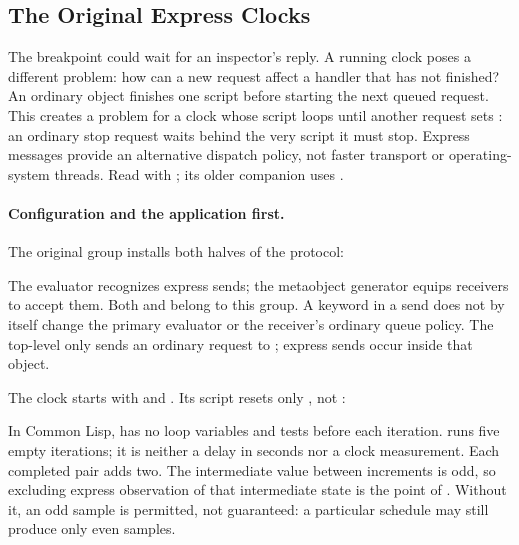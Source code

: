 \subsection{The Original Express Clocks}
\label{sec:original-express}

The breakpoint could wait for an inspector's reply. A running clock poses
a different problem: how can a new request affect a handler that has
not finished? An ordinary object finishes one script before starting the next queued
request. This creates a problem for a clock whose  script
loops until another request sets : an ordinary stop request
waits behind the very script it must stop. Express messages provide an
alternative dispatch policy, not faster transport or operating-system
threads. Read  with
; its older companion uses
.

\paragraph{Configuration and the application first.}
The original group installs both halves of the protocol:


The evaluator recognizes express sends; the metaobject generator equips
receivers to accept them. Both  and  belong to this
group. A keyword in a send does not by itself change the primary evaluator
or the receiver's ordinary queue policy. The top-level only sends an
ordinary request to ; express sends occur inside that object.

The clock starts with  and .
Its  script resets only , not :


In Common Lisp,  has no loop variables and tests
 before each iteration.  runs five empty
iterations; it is neither a delay in seconds nor a clock measurement.
Each completed pair adds two. The intermediate value between increments
is odd, so excluding express observation of that intermediate state is
the point of . Without it, an odd sample is permitted, not
guaranteed: a particular schedule may still produce only even samples.

